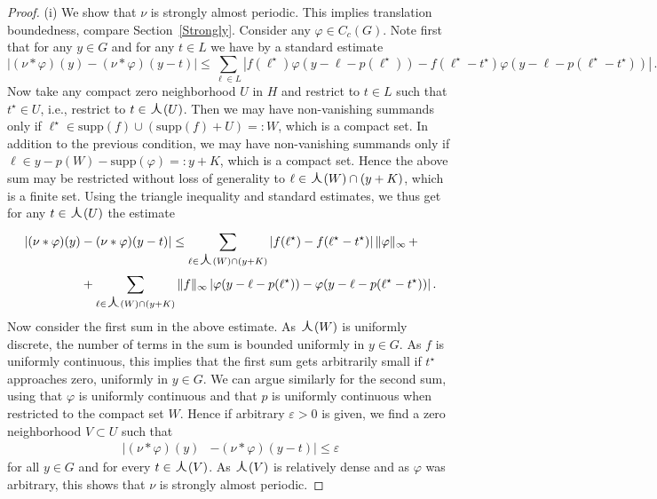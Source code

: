 \documentclass[11pt, a4wide]{amsart}
\newcommand{\oplam}{\mbox{\Large $\curlywedge$}}
\newcommand{\supp}{\mbox{supp}}
\numberwithin{lemma}{section}
\begin{document}
\begin{proof}

\noindent (i)
We show that $\nu$ is strongly almost periodic. This implies translation boundedness, compare Section~\ref{Strongly}.
Consider any $\varphi\in C_c(G)$. Note first that for any $y \in G$ and for any $t\in L$ we have by a standard estimate
%
\begin{displaymath} \label{strongly-almost-periodic-inequality}
|(\nu * \varphi)(y) - (\nu * \varphi)(y-t)|  \le
\sum_{\ell \in L} |f(\ell^{\star})\varphi(y-\ell-p(\ell^{\star})) - f(\ell^{\star} - t^{\star})\varphi(y-\ell-p(\ell^{\star}-t^{\star}))| \,.
\end{displaymath}
%
Now take any compact zero neighborhood $U$ in $H$ and restrict to $t\in L$ such that $t^\star\in U$, i.e., restrict to $t\in\oplam(U)$. Then we may have non-vanishing summands only if $\ell^\star\in \supp(f) \cup (\supp(f)+U)=:W$, which is a compact set. In addition to the previous condition, we may have non-vanishing summands only if $\ell\in y-p(W)-\supp(\varphi)=:y+K$, which is a compact set. Hence the above sum may be restricted without loss of generality to $\ell\in\oplam(W)\cap (y+K)$, which is a finite set. Using the triangle inequality and standard estimates, we thus get  for any $t \in \oplam(U)$ the estimate
%
%
\begin{displaymath}
\begin{split}
|(\nu * \varphi)(y) &- ( \nu * \varphi)(y-t)|
\le  \sum_{\ell \in \oplam(W)\cap (y+K)}  |f(\ell^{\star}) - f(\ell^{\star} - t^{\star})| \,\|\varphi\|_\infty \, +\\
&+ \sum_{\ell \in \oplam(W)\cap (y+K)}  \|f\|_\infty\, |\varphi(y-\ell-p(\ell^{\star})) - \varphi(y-\ell-p(\ell^{\star}-t^{\star}))| \,.
\end{split}
\end{displaymath}
%
Now consider the first sum in the above estimate. As $\oplam(W)$ is uniformly discrete, the number of terms in the sum is bounded uniformly in $y\in G$. As $f$ is uniformly continuous, this implies that the first sum gets arbitrarily small if $t^\star$ approaches zero, uniformly in $y\in G$. We can argue similarly for the second sum, using that $\varphi$ is uniformly continuous and that $p$ is uniformly continuous when restricted to the compact set $W$. Hence if arbitrary $\varepsilon>0$ is given, we find a zero neighborhood $V\subset U$ such that
%
\begin{displaymath}
\begin{split}
|(\nu * \varphi)(y) &- ( \nu * \varphi)(y-t)| \le \varepsilon
\end{split}
\end{displaymath}
%
for all $y\in G$ and for every $t\in \oplam(V)$. As $\oplam(V)$ is relatively dense and as $\varphi$ was arbitrary, this shows that $\nu$ is strongly almost periodic.


\end{proof}
\end{document}
